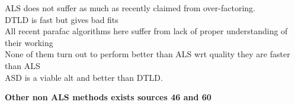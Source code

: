 \documentclass[10pt, draft]{article}
\begin{document}

ALS does not suffer as much as recently claimed from over-factoring.\\
DTLD is fast but gives bad fits\\
All recent parafac algorithms here suffer from lack of proper understanding of their working\\
None of them turn out to perform better than ALS wrt quality they are faster than ALS \\
ASD is a viable alt and better than DTLD.  \linebreak[1]

\textbf{Other non ALS methods exists sources 46 and 60}\linebreak[1]
\end{document}

